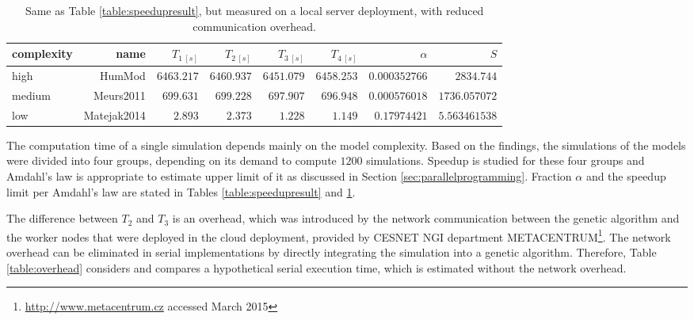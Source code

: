 \begin{table}[htb]
\footnotesize
\begin{tabular}{|l|r|r|r|r|r|r|r|}
\hline
complexity & name & $T_{1~[s]}$ & $T_{2~[s]}$ & $T_{3~[s]}$ & $T_{4~[s]}$ & $\alpha$ & $S$ \\
\hline
high & HumMod \cite{Kofranek2011hummod} & $\num{6463.217}$ & $\num{6460.937}$ & $\num{6451.079}$ & $\num{6458.253}$ & $\num{0.000352766}$ & $\num{2834.744}$ \\
medium & Meurs2011\cite{Meurs2011} & $\num{699.631}$ & $\num{699.228}$ & $\num{697.907}$ & $\num{696.948}$ & $\num{0.000576018}$ & $\num{1736.057072}$ \\
low & Matejak2014\cite{Matejak2014sj} & $\num{2.893}$ & $\num{2.373}$ & $\num{1.228}$ & $\num{1.149}$ & $\num{0.17974421}$ & $\num{5.563461538}$\\ \hline
\end{tabular}
\caption{Same as Table \ref{table:speedupresult}, but measured on a local server deployment, with reduced communication overhead.}
\label{table:speedupresult2}
\end{table}

The computation time of a single simulation depends mainly on the model complexity. Based on the findings, the simulations of the models were divided into four groups, depending on its demand to compute $\num{1200}$ simulations. Speedup is studied for these four groups and Amdahl's law is appropriate to estimate upper limit of it as discussed in Section \ref{sec:parallelprogramming}. Fraction $\alpha$ and the speedup limit per Amdahl's law are stated in Tables \ref{table:speedupresult} and \ref{table:speedupresult2}. 

The difference between $T_2$ and $T_3$ is an overhead, which was introduced by the network communication between the genetic algorithm and the worker nodes that were deployed in the cloud deployment, provided by CESNET NGI department METACENTRUM\footnote{\url{http://www.metacentrum.cz} accessed March 2015}. The network overhead can be eliminated in serial implementations by directly integrating the simulation into a genetic algorithm. Therefore, Table \ref{table:overhead} considers and compares a hypothetical serial execution time, which is estimated without the network overhead.

